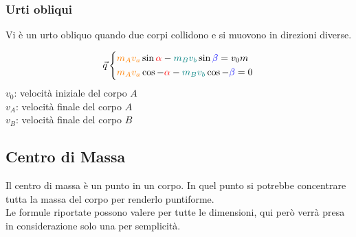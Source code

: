\subsubsection{Urti obliqui}
Vi è un urto obliquo quando due corpi collidono e si muovono in direzioni diverse.
\begin{center}
\end{center}
\begin{equation*}
  \vec{q}
  \begin{cases*}
    \mathcolor{orange}{m_A}\mathcolor{orange}{v_a}\sin\mathcolor{red}{\alpha}-
    \mathcolor{teal}{m_B}\mathcolor{teal}{v_b}\sin\mathcolor{blue}{\beta} = v_0m\\
    \mathcolor{orange}{m_A}\mathcolor{orange}{v_a}\cos-\mathcolor{red}{\alpha}-
    \mathcolor{teal}{m_B}\mathcolor{teal}{v_b}\cos-\mathcolor{blue}{\beta} = 0
  \end{cases*}
\end{equation*}
$v_0$: velocità iniziale del corpo $A$\\
$v_A$: velocità finale del corpo $A$\\
$v_B$: velocità finale del corpo $B$

\subsection{Centro di Massa}\label{subsec:dinamica:cm}
Il centro di massa è un punto in un corpo. In quel punto si potrebbe concentrare tutta la massa del
corpo per renderlo puntiforme.\\
Le formule riportate possono valere per tutte le dimensioni, qui però
verrà presa in considerazione solo una per semplicità.

